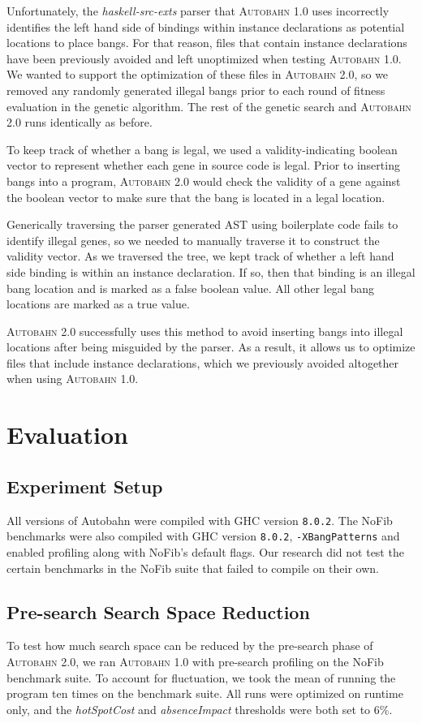 \documentclass[format=sigplan, review=true]{acmart}
\newcommand{\hotspotcost}[0]{\textit{hotSpotCost}}
\newcommand{\Ao}[0]{\textsc{Autobahn 1.0}}
\newcommand{\At}[0]{\textsc{Autobahn 2.0}}
\newcommand{\preopt}[0]{pre-search}
\newcommand{\Preopt}[0]{Pre-search}
\newcommand{\absim}[0]{\textit{absenceImpact}}
\begin{document}
Unfortunately, the \textit{haskell-src-exts} parser that \Ao{} uses incorrectly identifies the left hand side of bindings within instance declarations as potential locations to place bangs. For that reason, files that contain instance declarations have been previously avoided and left unoptimized when testing \Ao{}. We wanted to support the optimization of these files in \At{}, so we removed any randomly generated illegal bangs prior to each round of fitness evaluation in the genetic algorithm. The rest of the genetic search and \At{} runs identically as before.

To keep track of whether a bang is legal, we used a validity-indicating boolean vector to represent whether each gene in source code is legal. Prior to inserting bangs into a program, \At{} would check the validity of a gene against the boolean vector to make sure that the bang is located in a legal location.

Generically traversing the parser generated AST using boilerplate code fails to identify illegal genes, so we needed to manually traverse it to construct the validity vector. As we traversed the tree, we kept track of whether a left hand side binding is within an instance declaration. If so, then that binding is an illegal bang location and is marked as a false boolean value. All other legal bang locations are marked as a true value.

\At{} successfully uses this method to avoid inserting bangs into illegal locations after being misguided by the parser. As a result, it allows us to optimize files that include instance declarations, which we previously avoided altogether when using \Ao{}. 

\section{Evaluation}

\subsection{Experiment Setup}

All versions of Autobahn were compiled with GHC version \texttt{8.0.2}. The NoFib benchmarks were also compiled with GHC version \texttt{8.0.2}, \texttt{-XBangPatterns} and enabled profiling along with NoFib's default flags. Our research did not test the certain benchmarks in the NoFib suite that failed to compile on their own.

\subsection{\Preopt{} Search Space Reduction}
To test how much search space can be reduced by the \preopt{} phase of \At{}, we ran \Ao{} with \preopt{} profiling on the NoFib benchmark suite. To account for fluctuation, we took the mean of running the program ten times on the benchmark suite. All runs were optimized on runtime only, and the \hotspotcost{} and \absim{} thresholds were both set to 6\%. 
\end{document}
